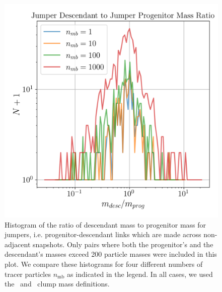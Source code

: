 \begin{figure}
  \centering
  \includegraphics[width=.7\linewidth, keepaspectratio]
	{figures/ACACIA/tree-statistics-my-threshold/jumper_mass_ratio-ntrace.png}%
  \caption{ Histogram of the ratio of descendant mass to progenitor
    mass for jumpers, i.e.  progenitor-descendant links which are made
    across non-adjacent snapshots.  Only pairs where both the
    progenitor's and the descendant's masses exceed 200 particle
    masses were included in this plot.  We compare these histograms
    for four different numbers of tracer particles $n_{\mathrm{mb}}$ as
    indicated in the legend.  In all cases, we used the \exc\ and
    \sad\ clump mass definitions.
  }%
  \label{fig:jumper-mass-ratio}
\end{figure}



